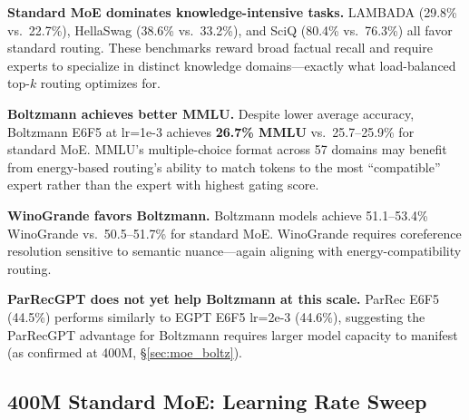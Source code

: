 \documentclass[oneside]{article}
\begin{document}
\textbf{Standard MoE dominates knowledge-intensive tasks.} LAMBADA (29.8\% vs.\ 22.7\%), HellaSwag (38.6\% vs.\ 33.2\%), and SciQ (80.4\% vs.\ 76.3\%) all favor standard routing. These benchmarks reward broad factual recall and require experts to specialize in distinct knowledge domains---exactly what load-balanced top-$k$ routing optimizes for.

\textbf{Boltzmann achieves better MMLU.} Despite lower average accuracy, Boltzmann E6F5 at lr=1e-3 achieves \textbf{26.7\% MMLU} vs.\ 25.7--25.9\% for standard MoE. MMLU's multiple-choice format across 57 domains may benefit from energy-based routing's ability to match tokens to the most ``compatible'' expert rather than the expert with highest gating score.

\textbf{WinoGrande favors Boltzmann.} Boltzmann models achieve 51.1--53.4\% WinoGrande vs.\ 50.5--51.7\% for standard MoE. WinoGrande requires coreference resolution sensitive to semantic nuance---again aligning with energy-compatibility routing.

\textbf{ParRecGPT does not yet help Boltzmann at this scale.} ParRec E6F5 (44.5\%) performs similarly to EGPT E6F5 lr=2e-3 (44.6\%), suggesting the ParRecGPT advantage for Boltzmann requires larger model capacity to manifest (as confirmed at 400M, \S\ref{sec:moe_boltz}).


\subsection{400M Standard MoE: Learning Rate Sweep}
\label{sec:moe_lr}
\end{document}
